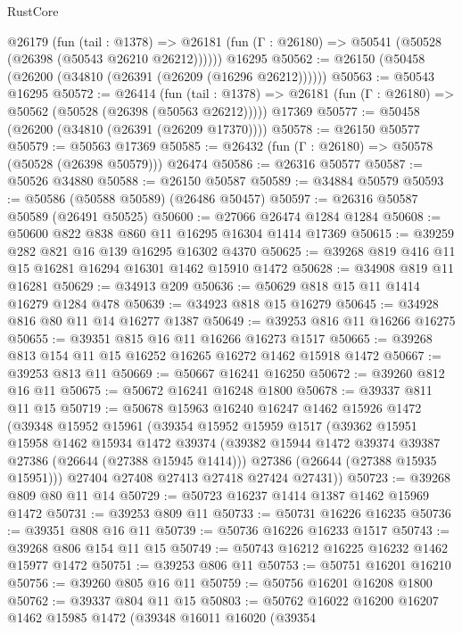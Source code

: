 \begin{lexlean}{RustCore}
\begin{coremodule}
    @26179
      (fun (tail : @1378) =>
      @26181 (fun (Γ : @26180) => @50541 (@50528 (@26398 (@50543 @26210 @26212))))))
    @16295
@50562 := @26150 (@50458 (@26200 (@34810 (@26391 (@26209 (@16296 @26212))))))
@50563 := @50543 @16295
@50572 := @26414
    (fun (tail : @1378) => @26181 (fun (Γ : @26180) => @50562 (@50528 (@26398 (@50563 @26212)))))
    @17369
@50577 := @50458 (@26200 (@34810 (@26391 (@26209 @17370))))
@50578 := @26150 @50577
@50579 := @50563 @17369
@50585 := @26432 (fun (Γ : @26180) => @50578 (@50528 (@26398 @50579))) @26474
@50586 := @26316 @50577
@50587 := @50526 @34880
@50588 := @26150 @50587
@50589 := @34884 @50579
@50593 := @50586 (@50588 @50589) (@26486 @50457)
@50597 := @26316 @50587 @50589 (@26491 @50525)
@50600 := @27066 @26474 @1284 @1284
@50608 := @50600 @822 @838 @860 @11 @16295 @16304 @1414 @17369
@50615 := @39259 @282 @821 @16 @139 @16295 @16302 @4370
@50625 := @39268 @819 @416 @11 @15 @16281 @16294 @16301 @1462 @15910 @1472
@50628 := @34908 @819 @11 @16281
@50629 := @34913 @209
@50636 := @50629 @818 @15 @11 @1414 @16279 @1284 @478
@50639 := @34923 @818 @15 @16279
@50645 := @34928 @816 @80 @11 @14 @16277 @1387
@50649 := @39253 @816 @11 @16266 @16275
@50655 := @39351 @815 @16 @11 @16266 @16273 @1517
@50665 := @39268 @813 @154 @11 @15 @16252 @16265 @16272 @1462 @15918 @1472
@50667 := @39253 @813 @11
@50669 := @50667 @16241 @16250
@50672 := @39260 @812 @16 @11
@50675 := @50672 @16241 @16248 @1800
@50678 := @39337 @811 @11 @15
@50719 := @50678
    @15963
    @16240
    @16247
    @1462
    @15926
    @1472
    (@39348
      @15952
      @15961
      (@39354
        @15952
        @15959
        @1517
        (@39362
          @15951
          @15958
          @1462
          @15934
          @1472
          @39374
          (@39382 @15944 @1472 @39374 @39387 @27386 (@26644 (@27388 @15945 @1414)))
          @27386
          (@26644 (@27388 @15935 @15951)))
        @27404
        @27408
        @27413
        @27418
        @27424
        @27431))
@50723 := @39268 @809 @80 @11 @14
@50729 := @50723 @16237 @1414 @1387 @1462 @15969 @1472
@50731 := @39253 @809 @11
@50733 := @50731 @16226 @16235
@50736 := @39351 @808 @16 @11
@50739 := @50736 @16226 @16233 @1517
@50743 := @39268 @806 @154 @11 @15
@50749 := @50743 @16212 @16225 @16232 @1462 @15977 @1472
@50751 := @39253 @806 @11
@50753 := @50751 @16201 @16210
@50756 := @39260 @805 @16 @11
@50759 := @50756 @16201 @16208 @1800
@50762 := @39337 @804 @11 @15
@50803 := @50762
    @16022
    @16200
    @16207
    @1462
    @15985
    @1472
    (@39348
      @16011
      @16020
      (@39354

\end{coremodule}
\end{lexlean}
